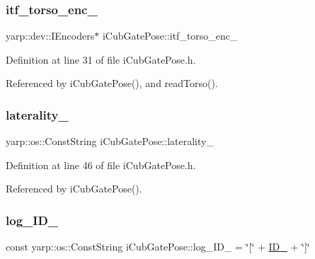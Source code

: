 \subsubsection{\texorpdfstring{itf\+\_\+torso\+\_\+enc\+\_\+}{itf\_torso\_enc\_}}
{\footnotesize\ttfamily yarp\+::dev\+::\+I\+Encoders$\ast$ i\+Cub\+Gate\+Pose\+::itf\+\_\+torso\+\_\+enc\+\_\+\hspace{0.3cm}{\ttfamily [protected]}}



Definition at line 31 of file i\+Cub\+Gate\+Pose.\+h.



Referenced by i\+Cub\+Gate\+Pose(), and read\+Torso().

\mbox{\label{classiCubGatePose_a738def17b96e37617d7a7ca9365bae6d}} 
\subsubsection{\texorpdfstring{laterality\+\_\+}{laterality\_}}
{\footnotesize\ttfamily yarp\+::os\+::\+Const\+String i\+Cub\+Gate\+Pose\+::laterality\+\_\+\hspace{0.3cm}{\ttfamily [private]}}



Definition at line 46 of file i\+Cub\+Gate\+Pose.\+h.



Referenced by i\+Cub\+Gate\+Pose().

\mbox{\label{classiCubGatePose_a79abca8331a8c99fcf05e44e681fe067}} 
\subsubsection{\texorpdfstring{log\+\_\+\+I\+D\+\_\+}{log\_ID\_}}
{\footnotesize\ttfamily const yarp\+::os\+::\+Const\+String i\+Cub\+Gate\+Pose\+::log\+\_\+\+I\+D\+\_\+ = \char`\"{}\mbox{[}\char`\"{} + \hyperlink{classiCubGatePose_a2e70b20ff45c269bfb6a339792f51fd0}{I\+D\+\_\+} + \char`\"{}\mbox{]}\char`\"{}\hspace{0.3cm}{\ttfamily [private]}}




